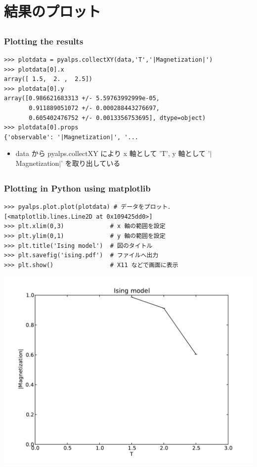 \section{結果のプロット}

\subsection*{\redm\whiteb\greenb}
\begin{frame}[t,fragile]
\frametitle{Plotting the results}
\begin{lstlisting}
>>> plotdata = pyalps.collectXY(data,'T','|Magnetization|')
>>> plotdata[0].x
array([ 1.5,  2. ,  2.5])
>>> plotdata[0].y
array([0.986621683313 +/- 5.59763992999e-05,
       0.911889051072 +/- 0.000288443276697,
       0.605402476752 +/- 0.0013356753695], dtype=object)
>>> plotdata[0].props
{'observable': '|Magnetization|', '...
\end{lstlisting}
\begin{itemize}
\item data から pyalps.collectXY により x 軸として 'T', y 軸として '$|$Magnetization$|$' を取り出している
\end{itemize}
\end{frame}

\subsection*{\redm\whiteb\greenb}
\begin{frame}[t,fragile]
\frametitle{Plotting in Python using matplotlib}
\begin{lstlisting}
>>> pyalps.plot.plot(plotdata) # データをプロット．
[<matplotlib.lines.Line2D at 0x109425dd0>]
>>> plt.xlim(0,3)             # x 軸の範囲を設定
>>> plt.ylim(0,1)             # y 軸の範囲を設定
>>> plt.title('Ising model')  # 図のタイトル
>>> plt.savefig('ising.pdf')  # ファイルへ出力
>>> plt.show()                # X11 などで画面に表示
\end{lstlisting}
\includegraphics[scale=0.2]{ising.pdf}
\end{frame}

